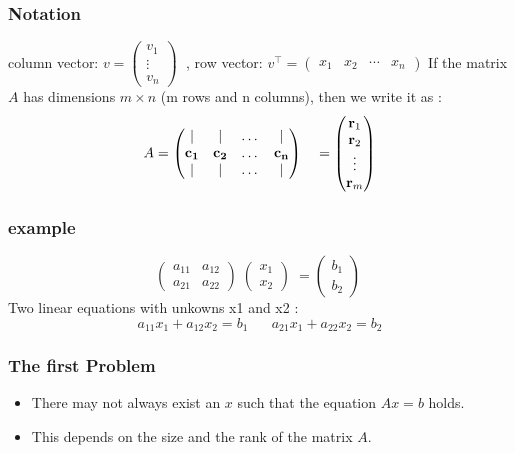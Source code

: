 \documentclass{beamer}
\begin{document}
\begin{frame}
	\frametitle{Notation}
	column vector: $ v = \begin{pmatrix} v_1 \\ \vdots \\ v_n \end{pmatrix} \;$ , 
	row vector: $v^\top = \begin{pmatrix} x_1 & x_2 & \cdots & x_n \end{pmatrix} $
		\newline 
		 \pause
		If the matrix $A$ has dimensions $ m \times n $ (m rows and n columns), then we write it as : 
\[
A = \begin{pmatrix}
    \vert & \vert & \dots & \vert \\
    \mathbf{c_1} & \mathbf{c_2} & \dots & \mathbf{c_n} \\
    \vert & \vert & \dots & \vert
\end{pmatrix}
\quad=
\begin{pmatrix}
    \text{\textbf{r}}_1 \\
    \text{\textbf{r}}_2 \\
    \vdots \\
    \text{\textbf{r}}_m
\end{pmatrix}
\]

\end{frame}

\begin{frame}
\frametitle{example}
$$
	\begin{pmatrix} a_{11} & a_{12} \\ a_{21} & a_{22} \end{pmatrix} \;
		\begin{pmatrix} x_{1}\\ x_{2} \end{pmatrix} \;
	= \begin{pmatrix} b_{1}\\ b_{2} \end{pmatrix} \;
	$$
Two linear equations with unkowns x1 and x2 : 
$$
	a_{11}x_{1} + a_{12}x_{2} = b_{1} \; \; \; \; \; \; a_{21}x_{1} + a_{22}x_{2} = b_{2} 
$$
\end{frame}
\begin{frame}
	\frametitle{The first Problem}
	\begin{itemize}
		
\item There may not always exist an $x$ such that the equation $Ax = b$ holds.
\item	This depends on the size and the rank of the matrix $A$.
	\end{itemize}
\end{frame}
\end{document}
